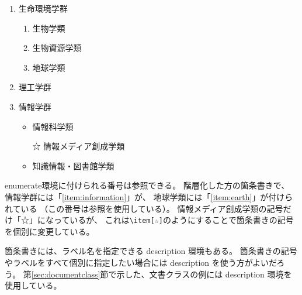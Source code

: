 \documentclass[fontsize=12pt, paper=a4]{jlreq}
\begin{document}
\begin{enumerate}

\item 生命環境学群
\begin{enumerate}
\item 生物学類
\item 生物資源学類
\item 地球学類\label{item:earth}
\end{enumerate}

\item 理工学群

\item 情報学群\label{item:information}
\begin{itemize}
\item 情報科学類
\item[☆] 情報メディア創成学類
\item 知識情報・図書館学類
\end{itemize}

\end{enumerate}

enumerate環境に付けられる番号は参照できる。
階層化した方の箇条書きで、
情報学群には「\ref{item:information}」が、
地球学類には「\ref{item:earth}」が付けられている
（この番号は参照を使用している）。
情報メディア創成学類の記号だけ「☆」になっているが、
これは\verb|\item[☆]|のようにすることで箇条書きの記号を個別に変更している。

箇条書きには、ラベル名を指定できる description 環境もある。
箇条書きの記号やラベルをすべて個別に指定したい場合には description を使う方がよいだろう。
第\ref{sec:documentclass}節で示した、文書クラスの例には description 環境を使用している。
\end{document}
